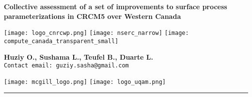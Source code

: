 \documentclass[a0b,landscape]{a0poster}
\begin{document}
\captionsetup{justification=raggedright}



\noindent\begin{minipage}[b]{\linewidth}
\centering
\noindent \huge \color{NavyBlue} \textbf{Collective assessment of a set of improvements to surface process parameterizations in CRCM5 over Western Canada} \color{Black}\\[0.25cm] %
\noindent\begin{minipage}[c]{0.25\linewidth}
      \center
      \texttt{[image: logo\_cnrcwp.png]} \texttt{[image: nserc\_narrow]} \texttt{[image: compute\_canada\_transparent\_small]}%
\end{minipage}
%
\hfill
%
\begin{minipage}[c]{0.45\linewidth}
  \center
  \large \textbf{Huziy O., Sushama L., Teufel B., Duarte L.} \\[0.5cm]
  \large \texttt{Contact email: guziy.sasha@gmail.com}
\end{minipage}
%
\hfill
%
\begin{minipage}[c]{0.25\linewidth}
  \center
  \texttt{[image: mcgill\_logo.png]} \texttt{[image: logo\_uqam.png]}   %
\end{minipage}
%
\rule{\linewidth}{3pt}
\end{minipage}
%


\end{document}
